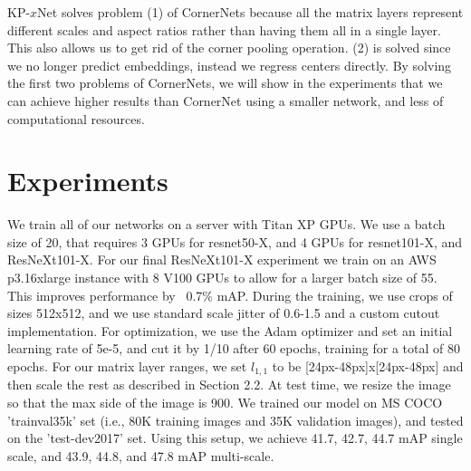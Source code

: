 \documentclass[10pt,twocolumn,letterpaper]{article}
\begin{document}
KP-$x$Net solves problem (1) of CornerNets because all the matrix layers represent different scales and aspect ratios rather than having them all in a single layer. This also allows us to get rid of the corner pooling operation. (2) is solved since we no longer predict embeddings, instead we regress centers directly. By solving the first two problems of CornerNets, we will show in the experiments that we can achieve higher results than CornerNet using a smaller network, and less of computational resources.
\vspace{-0.25cm}
\section{Experiments}
\vspace{-0.25cm}
We train all of our networks on a server with Titan XP GPUs. We use a batch size of 20, that requires 3 GPUs for resnet50-X, and 4 GPUs for resnet101-X, and ResNeXt101-X. For our final ResNeXt101-X experiment we train on an AWS p3.16xlarge instance with 8 V100 GPUs to allow for a larger batch size of 55. This improves performance by ~0.7\% mAP. During the training, we use crops of sizes 512x512, and we use standard scale jitter of 0.6-1.5 and a custom cutout \cite{devries2017improved} implementation. For optimization, we use the Adam optimizer and set an initial learning rate of 5e-5, and cut it by 1/10 after 60 epochs, training for a total of 80 epochs. For our matrix layer ranges, we set $l_{1,1}$ to be [24px-48px]x[24px-48px] and then scale the rest as described in Section 2.2. At test time, we resize the image so that the max side of the image is 900. We trained our model on MS COCO 'trainval35k' set (i.e., 80K training images and 35K validation images), and tested on the 'test-dev2017' set.  Using this setup, we achieve 41.7, 42.7, 44.7 mAP single scale, and 43.9, 44.8, and 47.8 mAP multi-scale.
\end{document}
